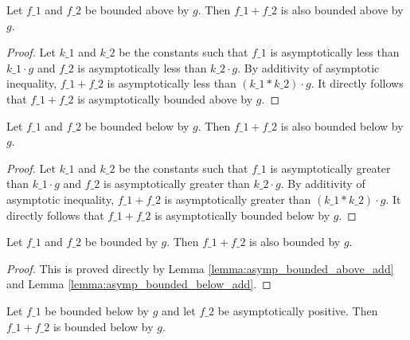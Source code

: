 \begin{lemma}
    \label{lemma:asymp_bounded_above_add}
    \leanok
    Let $f\_1$ and $f\_2$ be bounded above by $g$. Then $f\_1 + f\_2$ is also bounded 
    above by $g$.
\end{lemma}

\begin{proof}
    \leanok
    Let $k\_1$ and $k\_2$ be the constants such that $f\_1$ is asymptotically less than $k\_1 \cdot g$ 
    and $f\_2$ is asymptotically less than $k\_2 \cdot g$. By additivity of asymptotic
    inequality, $f\_1 + f\_2$ is asymptotically less than $(k\_1 * k\_2) \cdot g$.
    It directly follows that $f\_1 + f\_2$ is asymptotically bounded above by $g$.
\end{proof}

\begin{lemma}
    \label{lemma:asymp_bounded_below_add}
    \leanok
    Let $f\_1$ and $f\_2$ be bounded below by $g$. Then $f\_1 + f\_2$ is also bounded 
    below by $g$.
\end{lemma}

\begin{proof}
    \leanok
    Let $k\_1$ and $k\_2$ be the constants such that $f\_1$ is asymptotically greater than $k\_1 \cdot g$ 
    and $f\_2$ is asymptotically greater than $k\_2 \cdot g$. By additivity of asymptotic
    inequality, $f\_1 + f\_2$ is asymptotically greater than $(k\_1 * k\_2) \cdot g$.
    It directly follows that $f\_1 + f\_2$ is asymptotically bounded below by $g$.
\end{proof}

\begin{lemma}
    \label{lemma:asymp_bounded_add}
    \leanok
    Let $f\_1$ and $f\_2$ be bounded by $g$. Then $f\_1 + f\_2$ is also bounded by $g$.
\end{lemma}

\begin{proof}
    \leanok
    This is proved directly by Lemma \ref{lemma:asymp_bounded_above_add} and Lemma
    \ref{lemma:asymp_bounded_below_add}.
\end{proof}

\begin{lemma}
    \label{lemma:asymp_bounded_below_add_pos}
    \leanok
    Let $f\_1$ be bounded below by $g$ and let $f\_2$ be asymptotically positive. 
    Then $f\_1 + f\_2$ is bounded below by $g$.
\end{lemma}

